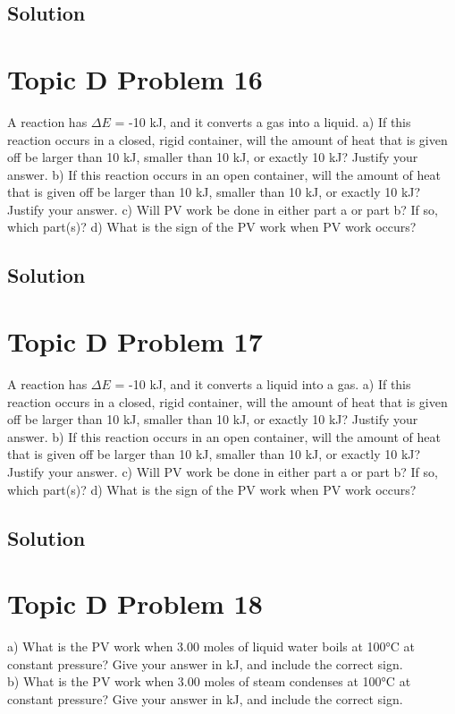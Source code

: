 \documentclass[10pt]{article}
\begin{document}
        \subsection{Solution}

    \pagebreak
    \section{Topic D Problem 16}
        A reaction has $\Delta E$ = -10 kJ, and it converts a gas into a liquid.
a) If this reaction occurs in a closed, rigid container, will the amount of heat that is given off
be larger than 10 kJ, smaller than 10 kJ, or exactly 10 kJ? Justify your answer.
b) If this reaction occurs in an open container, will the amount of heat that is given off be
larger than 10 kJ, smaller than 10 kJ, or exactly 10 kJ? Justify your answer.
c) Will PV work be done in either part a or part b? If so, which part(s)?
d) What is the sign of the PV work when PV work occurs?
        
        \subsection{Solution}

    \pagebreak
    \section{Topic D Problem 17}
        A reaction has $\Delta E$ = -10 kJ, and it converts a liquid into a gas.
a) If this reaction occurs in a closed, rigid container, will the amount of heat that is given off
be larger than 10 kJ, smaller than 10 kJ, or exactly 10 kJ? Justify your answer.
b) If this reaction occurs in an open container, will the amount of heat that is given off be
larger than 10 kJ, smaller than 10 kJ, or exactly 10 kJ? Justify your answer.
c) Will PV work be done in either part a or part b? If so, which part(s)?
d) What is the sign of the PV work when PV work occurs?
        
        \subsection{Solution}

    \pagebreak
    \section{Topic D Problem 18}
        a) What is the PV work when 3.00 moles of liquid water boils at 100\unit{\celsius} at constant pressure? 
        Give your answer in kJ, and include the correct sign.\\
        b) What is the PV work when 3.00 moles of steam condenses at 100\unit{\celsius} at constant pressure?
        Give your answer in kJ, and include the correct sign.
\end{document}
